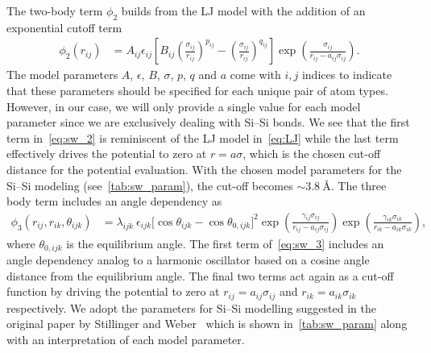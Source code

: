 The two-body term $\phi_2$ builds from the \acrshort{LJ} model with the addition of an exponential cutoff term
\begin{align}
  \phi_2(r_{i j}) & =A_{ij} \epsilon_{ij}\left[B_{ij}\left(\frac{\sigma_{ij}}{r_{ij}}\right)^{p_{ij}} - \left(\frac{\sigma_{ij}}{r_{ij}}\right)^{q_{ij}}\right] \exp (\frac{\sigma_{ij}}{r_{ij}-a_{ij} \sigma_{ij}}).
  \label{eq:sw_2}
\end{align}
The model parameters $A$, $\epsilon$, $B$, $\sigma$, $p$, $q$ and $a$ come with
$i,j$ indices to indicate that these parameters should be specified for each
unique pair of atom types. However, in our case, we will only provide a single
value for each model parameter since we are exclusively dealing with Si--Si bonds. We see that the first term in~\cref{eq:sw_2} is reminiscent of the \acrshort{LJ} model in~\cref{eq:LJ} while the last term effectively drives the potential to zero at $r=a\sigma$, which is the chosen cut-off distance for the potential evaluation. With the chosen model parameters for the Si--Si modeling (see~\cref{tab:sw_param}), the cut-off becomes $\sim \SI{3.8}{\text{Å}}$. The three body term includes an angle dependency as
\begin{align}
  \phi_3(r_{ij}, r_{ik}, \theta_{ijk}) &= \lambda_{ijk} \ \epsilon_{ijk} \Big[\cos \theta_{ijk}-\cos \theta_{0,ijk}\Big]^2 \exp (\frac{\gamma_{ij} \sigma_{ij}}{r_{ij} - a_{ij} \sigma_{ij}}) \exp (\frac{\gamma_{ik} \sigma_{ik}}{r_{ik} - a_{ik} \sigma_{ik}}),
  \label{eq:sw_3}
\end{align}
where $\theta_{0,ijk}$ is the equilibrium angle. The first term of~\cref{eq:sw_3} includes an angle dependency analog to a harmonic oscillator
based on a cosine angle distance from the equilibrium angle. The final two terms
act again as a cut-off function by driving the potential to zero at $r_{ij} =
a_{ij}\sigma_{ij}$ and $r_{ik} = a_{ik}\sigma_{ik}$ respectively. We adopt the parameters for Si--Si modelling suggested in the original paper by Stillinger and Weber~\cite{PhysRevB.31.5262} which is shown in~\cref{tab:sw_param} along with an interpretation of each model parameter.



